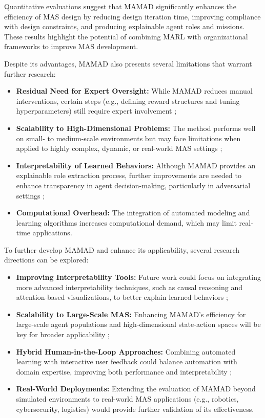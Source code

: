\documentclass[pdflatex,sn-mathphys-num]{sn-jnl}%
\theoremstyle{thmstyleone}%
\theoremstyle{thmstyletwo}%
\theoremstyle{thmstylethree}%
\begin{document}
Quantitative evaluations suggest that MAMAD significantly enhances the efficiency of MAS design by reducing design iteration time, improving compliance with design constraints, and producing explainable agent roles and missions. These results highlight the potential of combining MARL with organizational frameworks to improve MAS development.

Despite its advantages, MAMAD also presents several limitations that warrant further research:
%
\begin{itemize}
    \item \textbf{Residual Need for Expert Oversight:} While MAMAD reduces manual interventions, certain steps (e.g., defining reward structures and tuning hyperparameters) still require expert involvement ;
    \item \textbf{Scalability to High-Dimensional Problems:} The method performs well on small- to medium-scale environments but may face limitations when applied to highly complex, dynamic, or real-world MAS settings ;
    \item \textbf{Interpretability of Learned Behaviors:} Although MAMAD provides an explainable role extraction process, further improvements are needed to enhance transparency in agent decision-making, particularly in adversarial settings ;
    \item \textbf{Computational Overhead:} The integration of automated modeling and learning algorithms increases computational demand, which may limit real-time applications.
\end{itemize}


To further develop MAMAD and enhance its applicability, several research directions can be explored:
%
\begin{itemize}
    \item \textbf{Improving Interpretability Tools:} Future work could focus on integrating more advanced interpretability techniques, such as causal reasoning and attention-based visualizations, to better explain learned behaviors ;
    \item \textbf{Scalability to Large-Scale MAS:} Enhancing MAMAD's efficiency for large-scale agent populations and high-dimensional state-action spaces will be key for broader applicability ;
    \item \textbf{Hybrid Human-in-the-Loop Approaches:} Combining automated learning with interactive user feedback could balance automation with domain expertise, improving both performance and interpretability ;
    \item \textbf{Real-World Deployments:} Extending the evaluation of MAMAD beyond simulated environments to real-world MAS applications (e.g., robotics, cybersecurity, logistics) would provide further validation of its effectiveness.
\end{itemize}
\end{document}

